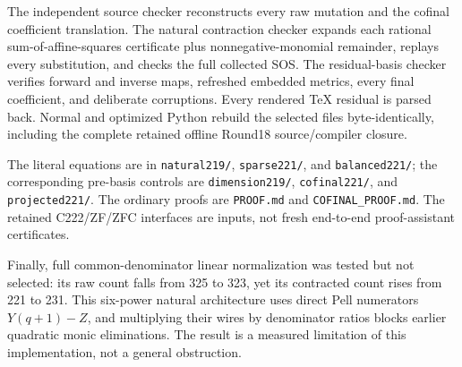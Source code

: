 The independent source checker reconstructs every raw mutation and the
cofinal coefficient translation.  The natural contraction checker expands
each rational sum-of-affine-squares certificate plus nonnegative-monomial
remainder, replays every substitution, and checks the full collected SOS.
The residual-basis checker verifies forward and inverse maps, refreshed
embedded metrics, every final coefficient, and deliberate corruptions.
Every rendered TeX residual is parsed back.  Normal and optimized Python
rebuild the selected files byte-identically, including the complete retained
offline Round18 source/compiler closure.

The literal equations are in \texttt{natural219/}, \texttt{sparse221/},
and \texttt{balanced221/}; the corresponding pre-basis controls are
\texttt{dimension219/}, \texttt{cofinal221/}, and \texttt{projected221/}.
The ordinary proofs are \texttt{PROOF.md} and \texttt{COFINAL\_PROOF.md}.
The retained C222/ZF/ZFC interfaces are inputs, not fresh end-to-end
proof-assistant certificates.

Finally, full common-denominator linear normalization was tested but not
selected: its raw count falls from 325 to 323, yet its contracted count
rises from 221 to 231.  This six-power natural architecture uses direct
Pell numerators \(Y(q+1)-Z\), and multiplying their wires by denominator
ratios blocks earlier quadratic monic eliminations.  The result is a
measured limitation of this implementation, not a general obstruction.
